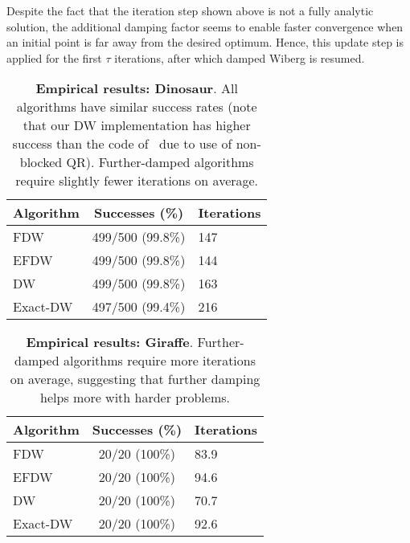 \documentclass[runningheads]{llncs}
\begin{document}
Despite the fact that the iteration step shown above is not a fully analytic solution, the additional damping factor seems to enable faster convergence when an initial point is far away from the desired optimum. Hence, this update step is applied for the first $\tau$ iterations, after which damped Wiberg is resumed.

\def\spc{\hspace*{1em}}
\begin{table}[b]
\begin{center}
\begin{tabular}{l|c|@{\spc}l}
Algorithm \spc&\spc Successes (\%)\spc & Iterations\\\hline
FDW &  499/500 (99.8\%) & 147\\
EFDW & 499/500 (99.8\%) & 144\\
DW &  499/500 (99.8\%) & 163\\
Exact-DW & 497/500 (99.4\%) & 216
\end{tabular}
\end{center}
\caption{{\bf Empirical results: Dinosaur}.   All algorithms have similar success rates (note that our DW implementation has higher success than the code of~\cite{okatani2011efficient} due to use of non-blocked QR).  Further-damped algorithms require slightly fewer iterations on average.}
\label{tbl:results-dino}
\end{table}

\begin{table}[b]
\begin{center}
\begin{tabular}{l|c|@{\spc}l}
Algorithm \spc&\spc Successes (\%)\spc & Iterations\\\hline
FDW &  20/20 (100\%) & 83.9\\
EFDW & 20/20 (100\%) & 94.6\\
DW &  20/20 (100\%) & 70.7\\
Exact-DW & 20/20 (100\%) & 92.6
\end{tabular}
\end{center}
\caption{{\bf Empirical results: Giraffe}.   Further-damped algorithms require more iterations on average, suggesting that further damping helps more with harder problems.}
\label{tbl:results-giraffe}
\end{table}
\end{document}

